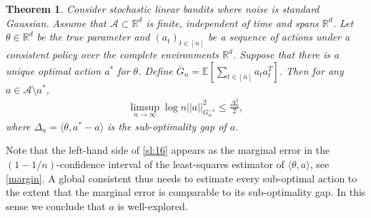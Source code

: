 \documentclass[letterpaper,11pt,openright,openany]{book}
\numberwithin{equation}{section}
\theoremstyle{plain}
\newtheorem{Th}{Theorem}[section]
\theoremstyle{definition}
\def\R{{\mathbb R}}
\def\E{{\mathbb E}}
\def\R{{\mathbb R}}
\def\t{{\theta}}
\begin{document}
\begin{Th}\label{sl:asym}
Consider stochastic linear bandits where noise is standard Gaussian. Assume that $\mathcal A\subset\R^d$ is finite, independent of time and spans $\R^d$. Let $\t\in\R^d$ be the true parameter and $(a_t)_{t\in [n]}$ be a sequence of actions under a consistent policy over the complete environments $\R^d$. Suppose that there is a unique optimal action $a^*$ for $\t$. Define $\bar{G}_n = \E[\sum_{t\in [n]}a_ta_t^T]$. Then for any $a\in\mathcal A\setminus a^*$, 
\begin{align}
\limsup_{n\to\infty}\log n ||a||^2_{G_n^{-1}}\leq\frac{\Delta_a^2}{2}, \label{sl:16}
\end{align} 
where $\Delta_a = \langle\t, a^*-a\rangle$ is the sub-optimality gap of $a$. 
\end{Th}
Note that the left-hand side of \eqref{sl:16} appears as the marginal error in the $(1-1/n)$-confidence interval of the least-squares estimator of $\langle\t, a\rangle$, see \eqref{margin}. 
A global consistent thus needs to estimate every sub-optimal action to the extent that the marginal error is comparable to its sub-optimality gap.  
In this sense we conclude that $a$ is well-explored. 
\end{document}
